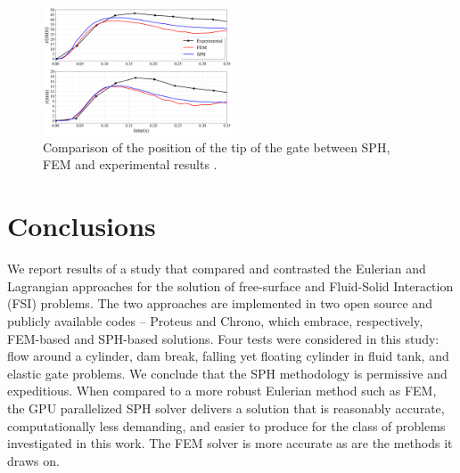 \documentclass[final,3p,times]{elsarticle}
\begin{document}
\begin{figure}[H]
    \vspace{-15pt}
	\begin{center}
		\includegraphics[width=0.5\textwidth]{Images/Fig_FSI.png}
	\end{center}
	\caption{Comparison of the position of the tip of the gate between SPH, FEM and experimental results \cite{Antoci2007}.}
	\label{fig:db_front_flexGate}
\end{figure}


\section{Conclusions}\label{sec:conclusion}
We report results of a study that compared and contrasted the Eulerian and Lagrangian approaches for the solution of free-surface and Fluid-Solid Interaction (FSI) problems. The two approaches are implemented in two open source and publicly available codes -- Proteus and Chrono, which embrace, respectively, FEM-based and SPH-based solutions. Four tests were considered in this study: flow around a cylinder, dam break, falling yet floating cylinder in fluid tank, and elastic gate problems. We conclude that the SPH methodology is permissive and expeditious. When compared to a more robust Eulerian method such as FEM, the GPU parallelized SPH solver delivers a solution that is reasonably accurate, computationally less demanding, and easier to produce for the class of problems investigated in this work.  The FEM solver is more accurate as are the methods it draws on.
\end{document}
